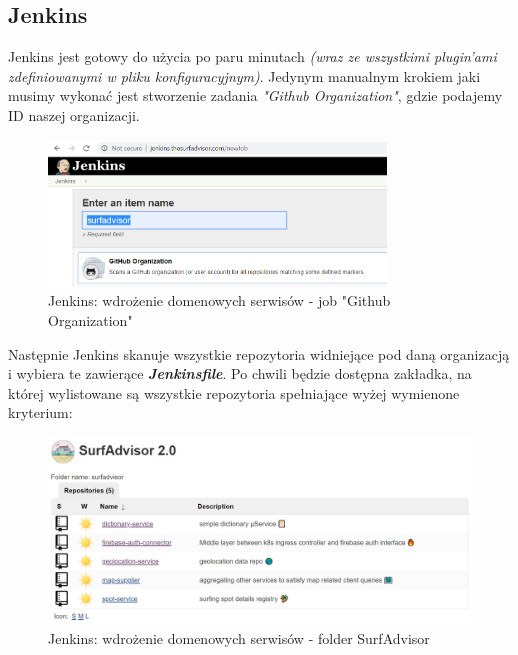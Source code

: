 \subsection{Jenkins}
\label{iac:jenkins}

Jenkins jest gotowy do użycia po paru minutach \emph{(wraz ze wszystkimi plugin'ami zdefiniowanymi w pliku konfiguracyjnym)}.
Jedynym manualnym krokiem jaki musimy wykonać jest stworzenie zadania \emph{"Github Organization"}, gdzie podajemy ID naszej organizacji.

\begin{figure}[!ht]
	\begin{center}
		\includegraphics[width=0.8\textwidth]{img/jenkins-new-job}
	\end{center}
	\caption{Jenkins: wdrożenie domenowych serwisów - job "Github Organization"}
\end{figure}

Następnie Jenkins skanuje wszystkie repozytoria widniejące pod daną organizacją i wybiera te zawierące \textbf{\emph{Jenkinsfile}}.
Po chwili będzie dostępna zakładka, na której wylistowane są wszystkie repozytoria spełniające wyżej wymienone kryterium:

\begin{figure}[!ht]
	\begin{center}
		\includegraphics[width=1\textwidth]{img/jenkins-surf-folder}
	\end{center}
	\caption{Jenkins: wdrożenie domenowych serwisów - folder SurfAdvisor}
\end{figure}

